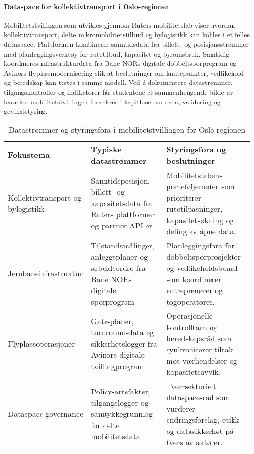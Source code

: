\paragraph{Dataspace for kollektivtransport i Oslo-regionen}
Mobilitetstvillingen som utvikles gjennom Ruters mobilitetslab viser hvordan kollektivtransport, delte mikromobilitetstilbud og bylogistikk kan kobles i et felles dataspace.\citep{ruter2024mobilitetslab,ruter2023dataplattform} Plattformen kombinerer sanntidsdata fra billett- og posisjonsstrømmer med planleggingsverktøy for rutetilbud, kapasitet og byromsbruk. Samtidig koordineres infrastrukturdata fra Bane NORs digitale dobbeltsporprogram og Avinors flyplassmodernisering slik at beslutninger om knutepunkter, vedlikehold og beredskap kan testes i samme modell.\citep{banenor2024digitalspor,banenor2023digital,avinor2022digital} Ved å dokumentere datastrømmer, tilgangskontroller og indikatorer får studentene et sammenhengende bilde av hvordan mobilitetstvillingen forankres i kapitlene om data, validering og gevinststyring.

\begin{table}[h]
    \centering
    \caption{Datastrømmer og styringsfora i mobilitetstvillingen for Oslo-regionen}
    \label{tab:mobilitet-dataspace}
    \begin{tabular}{p{3.5cm}p{4.8cm}p{4.6cm}}
        \toprule
        Fokustema & Typiske datastrømmer & Styringsfora og beslutninger \\
        \midrule
        Kollektivtransport og bylogistikk & Sanntidsposisjon, billett- og kapasitetsdata fra Ruters plattformer og partner-API-er & Mobilitetslabens porteføljemøter som prioriterer rutetilpasninger, kapasitetsøkning og deling av åpne data. \\
        Jernbaneinfrastruktur & Tilstandsmålinger, anleggsplaner og arbeidsordre fra Bane NORs digitale sporprogram & Planleggingsfora for dobbeltsporprosjekter og vedlikeholdsboard som koordinerer entreprenører og togoperatører. \\
        Flyplassoperasjoner & Gate-planer, turnround-data og sikkerhetslogger fra Avinors digitale tvillingprogram & Operasjonelle kontrolltårn og beredskapsråd som synkroniserer tiltak mot værhendelser og kapasitetsavvik. \\
        Dataspace-governance & Policy-artefakter, tilgangslogger og samtykkegrunnlag for delte mobilitetsdata & Tverrsektorielt dataspace-råd som vurderer endringsforslag, etikk og datasikkerhet på tvers av aktører. \\
        \bottomrule
    \end{tabular}
\end{table}

